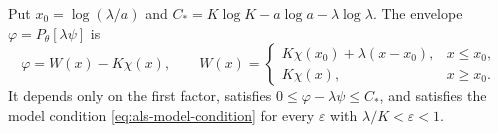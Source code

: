 \begin{lemma}\label{lem:nongauduchon-divisorial-model}
Put $x_0=\log(\lambda/a)$ and $C_*=K\log K-a\log a-\lambda\log\lambda$. The envelope $\varphi=P_\theta[\lambda\psi]$ is
\begin{equation}\label{eq:nongauduchon-model}
 \varphi=W(x)-K\chi(x),\qquad
 W(x)=\begin{cases}K\chi(x_0)+\lambda(x-x_0),&x\leq x_0,\\K\chi(x),&x\geq x_0.\end{cases}
\end{equation}
It depends only on the first factor, satisfies $0\leq\varphi-\lambda\psi\leq C_*$, and satisfies the model condition \eqref{eq:als-model-condition} for every $\varepsilon$ with $\lambda/K<\varepsilon<1$.
\end{lemma}
